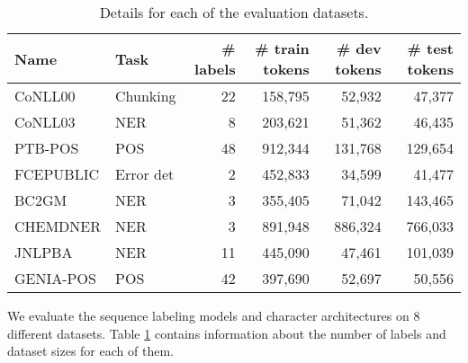 \documentclass[11pt]{article}
\begin{document}
\begin{table}
\centering
\begin{tabular}{llrrrr} \toprule
Name     & Task            & \# labels & \# train tokens & \# dev tokens & \# test tokens\\ \midrule
CoNLL00 & Chunking & 22 & 158,795 & 52,932 & 47,377 \\
CoNLL03 & NER & 8 & 203,621 & 51,362 & 46,435 \\
PTB-POS & POS &  48 & 912,344 & 131,768 & 129,654\\
FCEPUBLIC & Error det & 2 & 452,833 & 34,599 & 41,477 \\
BC2GM    & NER     & 3 & 355,405 & 71,042 & 143,465\\
CHEMDNER & NER & 3 & 891,948 & 886,324 & 766,033\\
JNLPBA   & NER & 11 & 445,090 & 47,461 & 101,039\\
GENIA-POS    & POS             & 42 & 397,690 & 52,697 & 50,556\\ \bottomrule
\end{tabular}
\caption{Details for each of the evaluation datasets.}
\label{tbl:datasets}
\end{table}

We evaluate the sequence labeling models and character architectures on 8 different datasets. Table \ref{tbl:datasets} contains information about the number of labels and dataset sizes for each of them.
\end{document}
